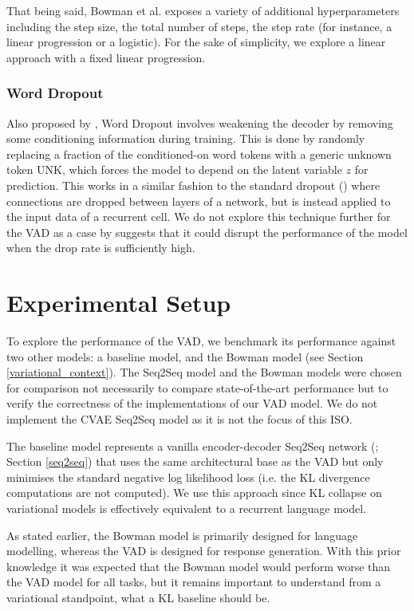 \documentclass[12pt,twoside]{report}
\begin{document}
That being said, Bowman et al. exposes a variety of additional hyperparameters including the step size, the total number of steps, the step rate (for instance, a linear progression or a logistic). For the sake of simplicity, we explore a linear approach with a fixed linear progression.

\subsection{Word Dropout}
Also proposed by \cite{bowman_generating_2015}, Word Dropout involves weakening the decoder by removing some conditioning information during training. This is done by randomly replacing a fraction of the conditioned-on word tokens with a generic unknown token UNK, which forces the model to depend on the latent variable $z$ for prediction. This works in a similar fashion to the standard dropout (\cite{srivastava_dropout:_2014}) where connections are dropped between layers of a network, but is instead applied to the input data of a recurrent cell. We do not explore this technique further for the VAD as a case by \cite{bowman_generating_2015} suggests that it could disrupt the performance of the model when the drop rate is sufficiently high.

\chapter{Experimental Setup}

To explore the performance of the VAD, we benchmark its performance against two other models: a baseline model, and the Bowman model (see Section \ref{variational_context}). The Seq2Seq model and the Bowman models were chosen for comparison not necessarily to compare state-of-the-art performance but to verify the correctness of the implementations of our VAD model. We do not implement the CVAE Seq2Seq model as it is not the focus of this ISO.

The baseline model represents a vanilla encoder-decoder Seq2Seq network (\cite{sutskever_sequence_2014}; Section \ref{seq2seq}) that uses the same architectural base as the VAD but only minimises the standard negative log likelihood loss (i.e. the KL divergence computations are not computed). We use this approach since KL collapse on variational models is effectively equivalent to a recurrent language model.

As stated earlier, the Bowman model is primarily designed for language modelling, whereas the VAD is designed for response generation. With this prior knowledge it was expected that the Bowman model would perform worse than the VAD model for all tasks, but it remains important to understand from a variational standpoint, what a KL baseline should be.
\end{document}

